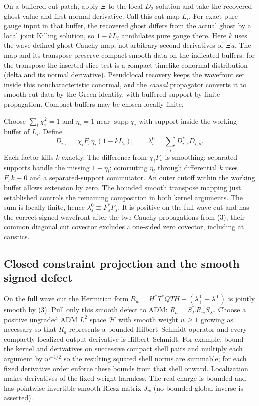 \documentclass[11pt]{article}
\newcommand{\supp}{\operatorname{supp}}
\begin{document}
On a buffered cut patch, apply $\Xi$ to the local $D_2$ solution
and take the recovered ghost value and first normal derivative.
Call this cut map $L_i$. For exact pure gauge input in that buffer,
the recovered ghost differs from the actual ghost by a local joint
Killing solution, so $1-kL_i$ annihilates pure gauge there. Here $k$
uses the wave-defined ghost Cauchy map, not arbitrary second
derivatives of $\Xi u$. The map and its transpose preserve compact
smooth data on the indicated buffers: for the transpose the inserted
slice test is a compact timelike-conormal distribution (delta and its
normal derivative). Pseudolocal recovery keeps the wavefront set inside
this noncharacteristic conormal, and the \emph{causal} propagator converts it to smooth
cut data by the Green identity, with buffered support by finite
propagation. Compact buffers may be chosen locally finite.

Choose $\sum_i\chi_i^2=1$ and $\eta_i=1$ near $\supp\chi_i$ with
support inside the working buffer of $L_i$. Define
\[
 D_{i,s}=\chi_i F_s\eta_i(1-kL_i),\qquad
 \lambda_s^0=\sum_i D_{i,s}^*D_{i,s}.
\]
Each factor kills $k$ exactly. The difference from $\chi_i F_s$
is smoothing: separated supports handle the missing $1-\eta_i$;
commuting $\eta_i$ through differential $k$ uses $F_sk\equiv0$
and a separated-support commutator. An outer cutoff within the
working buffer allows extension by zero. The bounded smooth transpose
mapping just established controls the remaining composition in both
kernel arguments. The sum is locally finite, hence
$\lambda_s^0\equiv F_s^*F_s$. It is positive on the full wave cut
and has the correct signed wavefront after the two Cauchy propagations
from (3); their common diagonal cut covector excludes a one-sided
zero covector, including at caustics.

\subsection{Closed constraint projection and the smooth signed defect}
On the full wave cut the Hermitian form
$R_w=H^*T^*QTH-(\lambda_+^0-\lambda_-^0)$ is jointly smooth
by (3). Pull only this smooth defect to ADM:
$R_a=S_\Sigma^*R_wS_\Sigma$. Choose a positive ungraded ADM
$L^2$ space $\mathcal H$ with smooth weight $w\geq1$ growing as
necessary so that $R_a$ represents a bounded Hilbert--Schmidt operator
and every compactly localized output derivative is Hilbert--Schmidt.
For example, bound the kernel and derivatives on successive compact
shell pairs and multiply each argument by $w^{-1/2}$ so the resulting
squared shell norms are summable; for each fixed derivative order
enforce these bounds from that shell onward. Localization makes
derivatives of the fixed weight harmless. The real charge is bounded
and has pointwise invertible smooth Riesz matrix $J_w$ (no bounded
global inverse is asserted).
\end{document}
